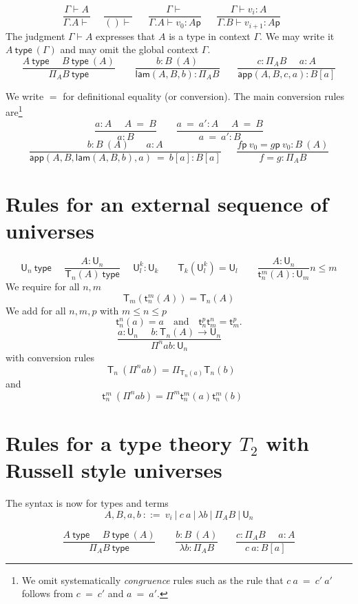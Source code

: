 \documentclass[11pt,a4paper]{article}
\theoremstyle{definition}
\newcommand{\conv}{=}
\def\UU{\mathsf{U}}
\newcommand{\type}{\mathsf{type}}
\newcommand{\LAM}{\mathsf{lam}}
\newcommand{\APP}{\mathsf{app}}
\newcommand{\T}{\mathsf{T}}
\newcommand{\sT}{\mathsf{t}}
\newcommand{\pp}{\mathsf{p}}
\begin{document}
\medskip



$$
\frac{\Gamma\vdash A}{\Gamma.A\vdash}~~~~~~\frac{}{()\vdash}~~~~~~~
\frac{\Gamma\vdash}{\Gamma.A\vdash v_0:A\pp}~~~~~~~
\frac{\Gamma\vdash v_i:A}{\Gamma.B\vdash v_{i+1}:A\pp}~~~~~~~
$$
The judgment $\Gamma\vdash A$ expresses that $A$ is a type in context $\Gamma$.
We may write it $A~\type~(\Gamma)$ and may omit the global context $\Gamma$.
$$
\frac{A~\type~~~~~~B~\type~(A)}{\Pi_AB~\type}~~~~~~~~~
\frac{b:B~(A)}{\LAM(A,B,b):\Pi_AB}~~~~~~~~
\frac{c:\Pi_AB~~~~~~a:A}
     {\APP(A,B,c,a):B[a]}
$$

We write $\conv$ for definitional equality (or conversion).
The main conversion rules are\footnote{We omit systematically {\em congruence} rules
  such as the rule that $c~a~\conv~c'~a'$ follows from $c~\conv~c'$ and $a~\conv~a'$.}
$$
\frac{ a:A~~~~~~ A~ \conv~ B}{ a:B}~~~~~~~~~
\frac{ a ~\conv~a':A~~~~~~ A  ~\conv~ B}{ a ~\conv~a':B}
$$
$$
\frac{b:B~(A)~~~~~~~~ a:A}{ \APP(A,B,\LAM(A,B,b),a)  ~\conv~ b[a]:B[a]}
~~~~~~~
\frac{f\pp~v_0 = g\pp~v_0:B~(A)}{ f = g : \Pi_AB}
$$

\section{Rules for an external sequence of universes}

$$
\UU_n~\type~~~~~~
\frac{A:\UU_{n}}{\T_{n}(A)~\type}~~~~~~
{\UU^{k}_l}:\UU_{k}~~~~~~~~~\T_{k}({\UU^{k}_l}) = \UU_{l}
~~~~~~~~~\frac{A:\UU_{n}}
{\sT_{n}^{m}(A):\UU_{m}}
n\leqslant m
$$
We require for all $n,m$
\[
\T_m(\sT_{n}^{m}(A)) = \T_{n}(A) 
\]
We add for all $n,m,p$ with $m\leqslant n\leqslant p$
$$
\sT_{n}^n(a) = a \quad\text{and}\quad \sT_{n}^p\sT_{m}^n = \sT_m^p.
$$
$$
\frac{a:\UU_{n}~~~~~~b:\T_{n}(A)\rightarrow \UU_{n}}
     {\Pi^{n} a b:\UU_{n}}~~~~~~~~~
$$
with conversion rules
$$
\T_{n}~(\Pi^{n} a b) = \Pi_{\T_{n}(a)}{\T_{n}(b)}~~~~~~~
$$
and
$$
\sT_{n}^{m}~(\Pi^{n} a b) = \Pi^{m} \sT_{n}^{m}(a) \sT_{n}^{m}(b)~~~~~~
$$

\section{Rules for a type theory $T_2$ with Russell style universes}

The syntax is now for types and terms
$$
A,B,a,b~::=~v_i~|~c~a~|~\lambda b~|~\Pi_{A}B~|~\UU_n
$$

$$
\frac{A~\type~~~~~~B~\type~(A)}{\Pi_AB~\type}~~~~~~~~~
\frac{b:B~(A)}{\lambda b:\Pi_AB}~~~~~~~~
\frac{c:\Pi_AB~~~~~~a:A}
     {c~a:B[a]}
$$
\end{document}

